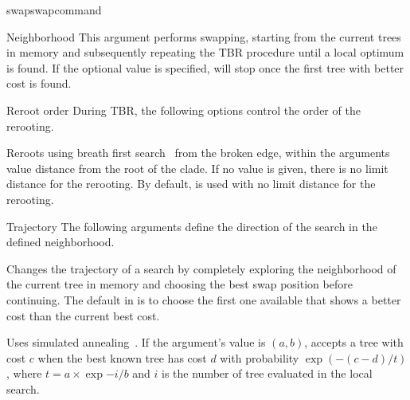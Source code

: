 \begin{command}{swap}{swapcommand}
\begin{arguments}
\begin{argumentgroup}{Neighborhood}
	            {This argument performs  swapping, starting
                from the current trees in memory and subsequently repeating
                the TBR procedure until  a local optimum is found.  If the optional value
                 is specified,  
                will stop once the first tree with better cost is found.}
                {}

        \end{argumentgroup}

  \begin{argumentgroup}{Reroot order}
            {During TBR, the following options control the order of the rerooting.}

                {Reroots using breath first search~\cite{cormen2001} from the broken edge, within the
                arguments value distance from the root of the clade. If no value is
                given, there is no limit distance for the rerooting. By default, 
                is used with no limit distance for the rerooting.}
                {}

        \end{argumentgroup}
        
       
        \begin{argumentgroup}{Trajectory}
            {The following arguments define the direction of the search in the defined
            neighborhood.}

                {Changes the trajectory of a search by
                completely exploring the neighborhood of the current
                tree in memory and choosing the best swap position
                before continuing.
                The default in \poy is to choose the first one
                available that shows a better cost than the current
                best cost.}
                {}

                {Uses simulated annealing~\cite{Kirkpatrick1983}. If the argument's value is $(a, b)$, 
                \poy accepts a tree with cost $c$ when the best known tree has
                cost $d$ with probability $\exp{(- (c - d) / t)}$, where
                $t = a \times \exp{- i / b}$ and $i$ is the number of tree
                evaluated in the local search.}
                {}


\end{argumentgroup}
\end{arguments}
\end{command}

